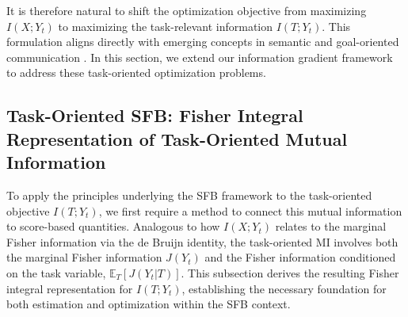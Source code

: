 \documentclass[conference]{IEEEtran}
\begin{document}
It is therefore natural to shift the optimization objective 
from maximizing $I(X;Y_t)$ to maximizing the task-relevant 
information $I(T;Y_t)$. This formulation aligns directly with 
emerging concepts in semantic and goal-oriented communication \cite{Gunduz2023}. 
In this section, we extend our information gradient framework 
to address these task-oriented optimization problems.

\subsection{Task-Oriented SFB: Fisher Integral Representation of Task-Oriented Mutual Information}
\label{subsec:sfb-task-fisher-int}

To apply the principles underlying the SFB framework to the task-oriented 
objective $I(T;Y_t)$, we first require a method to connect this mutual information 
to score-based quantities. 
Analogous to how $I(X;Y_t)$ relates to the marginal Fisher information via the de Bruijn identity, 
the task-oriented MI involves both the marginal Fisher information $J(Y_t)$ 
and the Fisher information conditioned on the task variable, $\mathbb{E}_T[J(Y_t|T)]$. 
This subsection derives the resulting Fisher integral representation for $I(T;Y_t)$, 
establishing the necessary foundation for both estimation and optimization within the SFB context.
\end{document}
